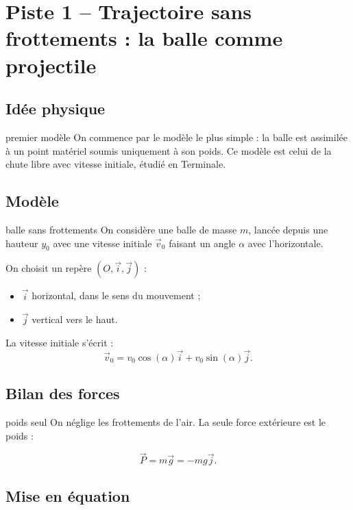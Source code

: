\documentclass[11pt,a4paper]{article}
\begin{document}
\section{Piste 1 -- Trajectoire sans frottements : la balle comme projectile}

\subsection{Idée physique}

\begin{idee}{premier modèle}
On commence par le modèle le plus simple : la balle est assimilée à un point matériel soumis uniquement à son poids. Ce modèle est celui de la chute libre avec vitesse initiale, étudié en Terminale.
\end{idee}

\subsection{Modèle}

\begin{modele}{balle sans frottements}
On considère une balle de masse $m$, lancée depuis une hauteur $y_0$ avec une vitesse initiale $\vec{v}_0$ faisant un angle $\alpha$ avec l'horizontale.

On choisit un repère $(O,\vec{i},\vec{j})$ :
\begin{itemize}
    \item $\vec{i}$ horizontal, dans le sens du mouvement ;
    \item $\vec{j}$ vertical vers le haut.
\end{itemize}

La vitesse initiale s'écrit :
\[
\vec{v}_0=v_0\cos(\alpha)\vec{i}+v_0\sin(\alpha)\vec{j}.
\]
\end{modele}

\subsection{Bilan des forces}

\begin{bilan}{poids seul}
On néglige les frottements de l'air. La seule force extérieure est le poids :

\[
\vec{P}=m\vec{g}=-mg\vec{j}.
\]
\end{bilan}

\subsection{Mise en équation}
\end{document}

